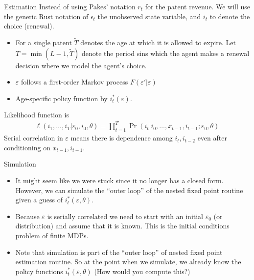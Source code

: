 \begin{frame}{Estimation}
Instead of using Pakes' notation $r_t$ for the patent revenue. We will use the generic Rust notation of $\epsilon_t$ the unobserved state variable, and $i_t$ to denote the choice (renewal).
\begin{itemize}
\item For a single patent $\tilde{T}$ denotes the age at which it is allowed to expire. Let $T = \min(L-1,\tilde{T})$ denote the period sins which the agent makes a renewal decision where we model the agent's choice.
\item $\varepsilon$ follows a first-order Markov process $F(\varepsilon' | \varepsilon)$
\item Age-specific policy function by $i^*_t(\varepsilon)$.
\end{itemize}
Likelihood function is 
\begin{align*}
\ell(i_1,\ldots,i_T | \varepsilon_0,i_0,\theta) = \prod_{t=1}^T \Pr(i_t | i_0, \ldots,  x_{t-1}, i_{t-1} ; \varepsilon_0, \theta)
\end{align*}
Serial correlation in $\varepsilon$ means there is dependence among $i_{t}, i_{t-2}$ even after conditioning on $x_{t-1},i_{t-1}$. 
\end{frame}

\begin{frame}{Simulation}
\begin{itemize}
\item It might seem like we were stuck since it no longer has a closed form.  However, we can simulate the ``outer loop'' of the nested fixed point routine given a guess  of $i^*_t(\varepsilon,\theta)$.
\item Because $\varepsilon$ is serially correlated we need to start with an initial $\varepsilon_0$ (or distribution) and assume that it is known.  This is the \alert{initial conditions problem} of finite MDPs.
\item Note that simulation is part of the ``outer loop'' of nested fixed point estimation routine. So at the point when we simulate, we already know the policy functions $i_t^{*}(\varepsilon,\theta)$ (How would you compute this?)
\end{itemize}
\end{frame}

